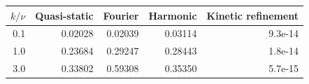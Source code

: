 \begin{tabular}{rrrrr}\toprule
$k/\nu$ & Quasi-static & Fourier & Harmonic & Kinetic refinement\\\midrule
0.1 & 0.02028 & 0.02039 & 0.03114 & 9.3e-14 \\
1.0 & 0.23684 & 0.29247 & 0.28443 & 1.8e-14 \\
3.0 & 0.33802 & 0.59308 & 0.35350 & 5.7e-15 \\
\bottomrule\end{tabular}
